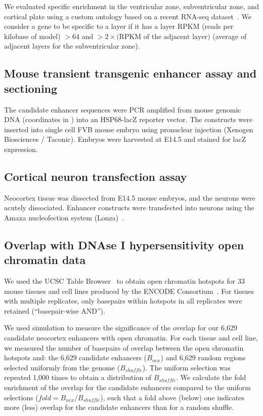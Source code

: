 We evaluated specific enrichment in the ventricular zone, subventricular zone, and cortical plate using a custom ontology based on a recent
RNA-seq dataset~\citep{Ayoub2011}.  We consider a gene to be specific to a layer if it has a layer RPKM (reads per kilobase of model)
$> 64$ and $> 2\times\mbox{(RPKM of the adjacent layer)}$ (average of adjacent layers for the subventricular zone).

\subsection{Mouse transient transgenic enhancer assay and sectioning}
The candidate enhancer sequences were PCR amplified from mouse genomic DNA (coordinates in ) into an HSP68-lacZ reporter
vector.  The constructs were inserted into single cell FVB mouse embryo using pronuclear injection (Xenogen Biosciences / Taconic).  Embryos
were harvested at E14.5 and stained for lacZ expression.

\subsection{Cortical neuron transfection assay}
Neocortex tissue was dissected from E14.5 mouse embryos, and the neurons were acutely dissociated.  Enhancer constructs were transfected
into neurons using the Amaxa nucleofection system (Lonza)~\citep{Maasho2004}.

\subsection{Overlap with DNAse I hypersensitivity open chromatin data}
We used the UCSC Table Browser~\citep{Karolchik2004} to obtain open chromatin hotspots for 33 mouse tissues and cell lines produced
by the ENCODE Consortium~\citep{John2011, Myers2011}.  For tissues with multiple replicates, only basepairs
within hotspots in all replicates were retained (``basepair-wise AND'').

We used simulation to measure the significance of the overlap for our 6,629 candidate neocortex enhancers with open chromatin.  For each
tissue and cell line, we measured the number of basepairs of overlap between the open chromatin hotspots and: the 6,629 candidate
enhancers ($B_{ncx}$) and 6,629 random regions selected uniformly from the genome ($B_{shuffle}$).
The uniform selection was repeated 1,000 times to obtain a distribution of $B_{shuffle}$.  We calculate the fold enrichment
of the overlap for the candidate enhancers compared to the uniform selections ($fold = B_{ncx}/B_{shuffle}$), such that
a fold above (below) one indicates more (less) overlap for the candidate enhancers than for a random shuffle.

